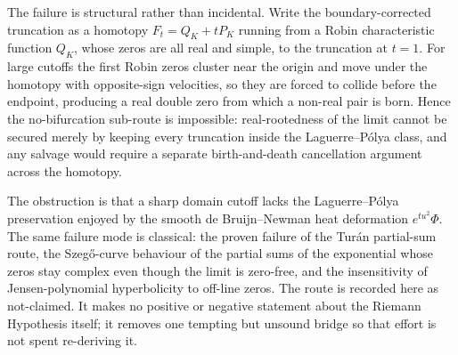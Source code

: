 \begin{principle}
\label{prin:rh-dyadic-forced-bifurcation}
The failure is structural rather than incidental. Write the
boundary-corrected truncation as a homotopy $F_t=Q_K+tP_K$ running from a
Robin characteristic function $Q_K$, whose zeros are all real and simple, to
the truncation at $t=1$. For large cutoffs the first Robin zeros cluster near
the origin and move under the homotopy with opposite-sign velocities, so they
are forced to collide before the endpoint, producing a real double zero from
which a non-real pair is born. Hence the no-bifurcation sub-route is
impossible: real-rootedness of the limit cannot be secured merely by keeping
every truncation inside the Laguerre--P\'olya class, and any salvage would
require a separate birth-and-death cancellation argument across the homotopy.
\end{principle}

\begin{principle}
\label{prin:rh-dyadic-route-scope}
The obstruction is that a sharp domain cutoff lacks the Laguerre--P\'olya
preservation enjoyed by the smooth de Bruijn--Newman heat deformation
$e^{tu^2}\Phi$. The same failure mode is classical: the proven failure of the
Tur\'an partial-sum route, the Szeg\H{o}-curve behaviour of the partial sums of the
exponential whose zeros stay complex even though the limit is zero-free, and
the insensitivity of Jensen-polynomial hyperbolicity to off-line zeros. The
route is recorded here as not-claimed. It makes no positive or negative
statement about the Riemann Hypothesis itself; it removes one tempting but
unsound bridge so that effort is not spent re-deriving it.
\end{principle}

